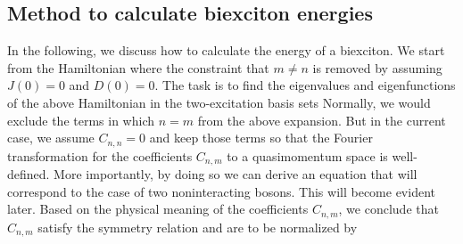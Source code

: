 \subsection{Method to calculate biexciton energies}
\label{subsec:biexcitonEnergy}
In the following, we discuss how to calculate the energy of a biexciton. We start from the Hamiltonian
where the constraint that $m\neq n$ is removed by assuming $J(0) = 0$ and $D(0) = 0$. The task is to find   the 
eigenvalues and eigenfunctions of the above Hamiltonian  in the
 two-excitation basis sets
Normally, we would exclude the terms in which $n = m$ from the above expansion. But in the current case, we assume
 $C_{n,n}=0$ and keep those terms so that the Fourier transformation for the coefficients $C_{n, m}$ to a
 quasimomentum space
 is well-defined. More importantly, by doing so we can derive an equation that will correspond to the case of two
 noninteracting bosons. This will become evident later. Based on the physical meaning of the coefficients $C_{n,m}$,
 we conclude that $C_{n,m}$ satisfy the symmetry relation
and are to be normalized by

